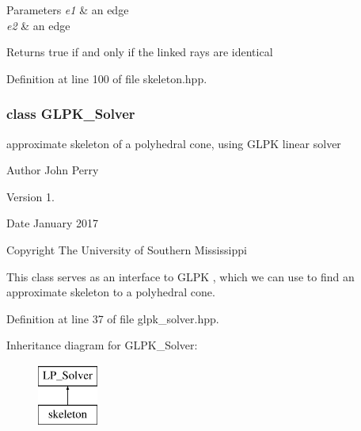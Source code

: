 \begin{DoxyParams}{Parameters}
{\em e1} & an edge \\
\hline
{\em e2} & an edge \\
\hline
\end{DoxyParams}
\begin{DoxyReturn}{Returns}
{\ttfamily true} if and only if the linked rays are identical 
\end{DoxyReturn}


Definition at line 100 of file skeleton.\+hpp.

\label{class_g_l_p_k___solver}
\subsubsection{class G\+L\+P\+K\+\_\+\+Solver}
approximate skeleton of a polyhedral cone, using G\+L\+PK linear solver 

\begin{DoxyAuthor}{Author}
John Perry 
\end{DoxyAuthor}
\begin{DoxyVersion}{Version}
1. 
\end{DoxyVersion}
\begin{DoxyDate}{Date}
January 2017 
\end{DoxyDate}
\begin{DoxyCopyright}{Copyright}
The University of Southern Mississippi
\end{DoxyCopyright}
This class serves as an interface to G\+L\+PK \cite{glpk}, which we can use to find an approximate skeleton to a polyhedral cone. 

Definition at line 37 of file glpk\+\_\+solver.\+hpp.

Inheritance diagram for G\+L\+P\+K\+\_\+\+Solver\+:\begin{figure}[H]
\begin{center}
\leavevmode
\includegraphics[height=2.000000cm]{group___c_l_s_solvers}
\end{center}
\end{figure}
